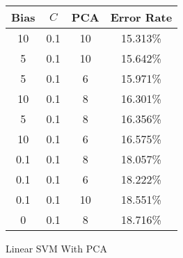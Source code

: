 \begin{center}
\begin{tabular}{|c|c|c|c|}
\hline
Bias & $C$ & PCA & Error Rate \\
\hline
10 & 0.1 & 10 & 15.313\% \\
\hline
5 & 0.1 & 10 & 15.642\% \\
\hline
5 & 0.1 & 6 & 15.971\% \\
\hline
10 & 0.1 & 8 & 16.301\% \\
\hline
5 & 0.1 & 8 & 16.356\% \\
\hline
10 & 0.1 & 6 & 16.575\% \\
\hline
0.1 & 0.1 & 8 & 18.057\% \\
\hline
0.1 & 0.1 & 6 & 18.222\% \\
\hline
0.1 & 0.1 & 10 & 18.551\% \\
\hline
0 & 0.1 & 8 & 18.716\% \\
\hline
\end{tabular}
\end{center}
\caption{Linear SVM With PCA}\label{tab:svm_linpca_acctable}

